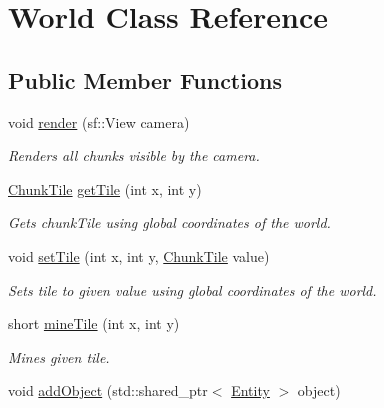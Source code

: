 \hypertarget{classWorld}{\section{World Class Reference}
\label{classWorld}
}
\subsection*{Public Member Functions}
\begin{DoxyCompactItemize}
\item 
\hypertarget{classWorld_a4ed73f6a1537aee3fa26a82de6a35437}{void \hyperlink{classWorld_a4ed73f6a1537aee3fa26a82de6a35437}{render} (sf\-::\-View camera)}\label{classWorld_a4ed73f6a1537aee3fa26a82de6a35437}

\begin{DoxyCompactList}\small\item\em Renders all chunks visible by the camera. \end{DoxyCompactList}\item 
\hypertarget{classWorld_ad8d693762cae3c31ec90fef9b44b97bf}{\hyperlink{classChunkTile}{Chunk\-Tile} \hyperlink{classWorld_ad8d693762cae3c31ec90fef9b44b97bf}{get\-Tile} (int x, int y)}\label{classWorld_ad8d693762cae3c31ec90fef9b44b97bf}

\begin{DoxyCompactList}\small\item\em Gets chunk\-Tile using global coordinates of the world. \end{DoxyCompactList}\item 
\hypertarget{classWorld_a9d374f8600da3aa484e48a5887772340}{void \hyperlink{classWorld_a9d374f8600da3aa484e48a5887772340}{set\-Tile} (int x, int y, \hyperlink{classChunkTile}{Chunk\-Tile} value)}\label{classWorld_a9d374f8600da3aa484e48a5887772340}

\begin{DoxyCompactList}\small\item\em Sets tile to given value using global coordinates of the world. \end{DoxyCompactList}\item 
short \hyperlink{classWorld_a1bbfac1b517a991c30aa96b57d04d265}{mine\-Tile} (int x, int y)
\begin{DoxyCompactList}\small\item\em Mines given tile. \end{DoxyCompactList}\item 
\hypertarget{classWorld_a3ffaf54defefc9038db98ef2595b2d00}{void \hyperlink{classWorld_a3ffaf54defefc9038db98ef2595b2d00}{add\-Object} (std\-::shared\-\_\-ptr$<$ \hyperlink{classEntity}{Entity} $>$ object)}\label{classWorld_a3ffaf54defefc9038db98ef2595b2d00}


\end{DoxyCompactItemize}
